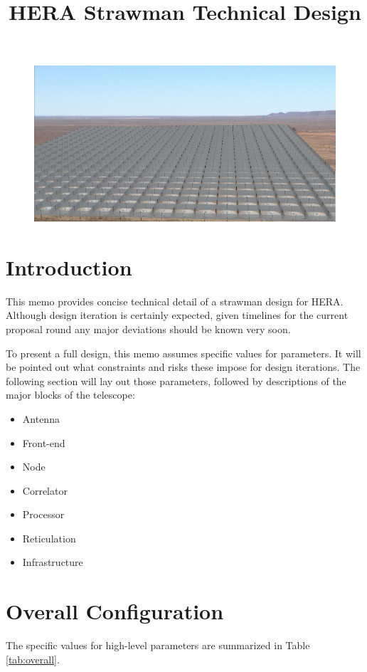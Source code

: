 \documentclass[11pt]{article}
\begin{document}
\title{HERA Strawman Technical Design}
\maketitle
\begin{figure}[H]
\centering
\includegraphics[width=\textwidth]{plots/hera_14m_view0611-1252.png}
\end{figure}

\section{Introduction} 
This memo provides concise technical detail of a strawman design for HERA.  Although design iteration is certainly expected, given timelines for the current proposal round any major deviations should be known very soon.

To present a full design, this memo assumes specific values for parameters.  It will be pointed out what constraints and risks these impose for design iterations.  The following section will lay out those parameters, followed by descriptions of the major blocks of the telescope:

\begin{itemize}
\item Antenna
\item Front-end
\item Node
\item Correlator
\item Processor
\item Reticulation
\item Infrastructure
\end{itemize}

\section{Overall Configuration}
The specific values for high-level parameters are summarized in Table \ref{tab:overall}.
\end{document}
